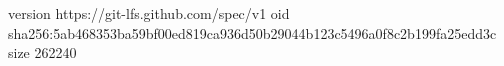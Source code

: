 version https://git-lfs.github.com/spec/v1
oid sha256:5ab468353ba59bf00ed819ca936d50b29044b123c5496a0f8c2b199fa25edd3c
size 262240
